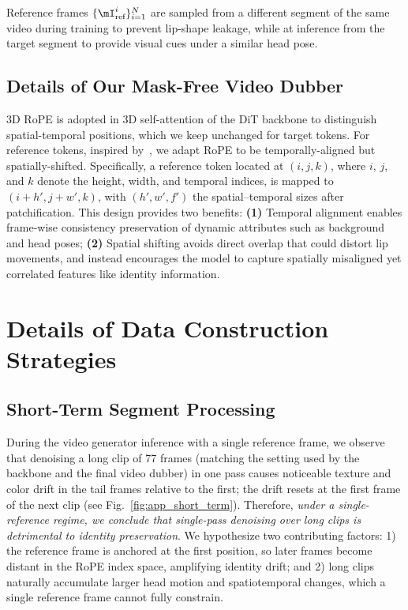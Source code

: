 Reference frames $\{\mI_{\text{ref}}^i\}_{i=1}^N$ are sampled from a different segment of the same video during training to prevent lip-shape leakage, while at inference from the target segment to provide visual cues under a similar head pose.

\subsection{Details of Our Mask-Free Video Dubber}
\label{appendix_sec:editor}
3D RoPE is adopted in 3D self-attention of the DiT backbone to distinguish spatial-temporal positions, which we keep unchanged for target tokens.
For reference tokens, inspired by~\citet{tan2024ominicontrol}, we adapt RoPE to be temporally-aligned but spatially-shifted.
Specifically, a reference token located at $(i,j,k)$, where $i$, $j$, and $k$ denote the height, width, and temporal indices, is mapped to $(i+h', j+w', k)$, with $(h',w',f')$ the spatial–temporal sizes after patchification.
This design provides two benefits:  
\textbf{(1)} Temporal alignment enables frame-wise consistency preservation of dynamic attributes such as background and head poses;
\textbf{(2)} Spatial shifting avoids direct overlap that could distort lip movements, and instead encourages the model to capture spatially misaligned yet correlated features like identity information.

\section{Details of Data Construction Strategies}
\label{appendix_sec:data_creation}

\subsection{Short-Term Segment Processing}
During the video generator inference with a single reference frame, we observe that denoising a long clip of 77 frames (matching the setting used by the backbone and the final video dubber) in one pass causes noticeable texture and color drift in the tail frames relative to the first; the drift resets at the first frame of the next clip (see Fig.~\ref{fig:app_short_term}).
Therefore, \textit{under a single-reference regime, we conclude that single-pass denoising over long clips is detrimental to identity preservation}. We hypothesize two contributing factors: 1) the reference frame is anchored at the first position, so later frames become distant in the RoPE index space, amplifying identity drift; and 2) long clips naturally accumulate larger head motion and spatiotemporal changes, which a single reference frame cannot fully constrain.

